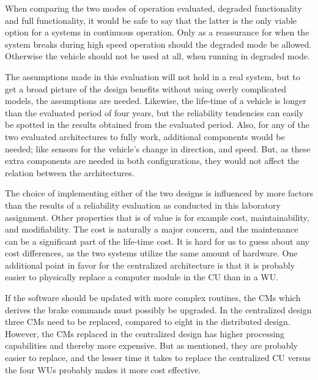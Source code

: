 When comparing the two modes of operation evaluated, degraded functionality and full functionality, it would be safe to say that the latter is the only viable option for a systems in continuous operation. Only as a reassurance for when the system breaks during high speed operation should the degraded mode be allowed. Otherwise the vehicle should not be used at all, when running in degraded mode.

The assumptions made in this evaluation will not hold in a real system, but to get a broad picture of the design benefits without using overly complicated models, the assumptions are needed. Likewise, the life-time of a vehicle is longer than the evaluated period of four years, but the reliability tendencies can easily be spotted in the results obtained from the evaluated period. Also, for any of the two evaluated architectures to fully work, additional components would be needed; like sensors for the vehicle's change in direction, and speed. But, as these extra components are needed in both configurations, they would not affect the relation between the architectures.

The choice of implementing either of the two designs is influenced by more factors than the results of a reliability evaluation as conducted in this laboratory assignment. Other properties that is of value is for example cost, maintainability, and modifiability. The cost is naturally a major concern, and the maintenance can be a significant part of the life-time cost. It is hard for us to guess about any cost differences, as the two systems utilize the same amount of hardware. One additional point in favor for the centralized architecture is that it is probably easier to physically replace a computer module in the CU than in a WU. 

If the software should be updated with more complex routines, the CMs which derives the brake commands must possibly be upgraded. In the centralized design three CMs need to be replaced, compared to eight in the distributed design. However, the CMs replaced in the centralized design has higher processing capabilities and thereby more expensive. But as mentioned, they are probably easier to replace, and the lesser time it takes to replace the centralized CU versus the four WUs probably makes it more cost effective. 